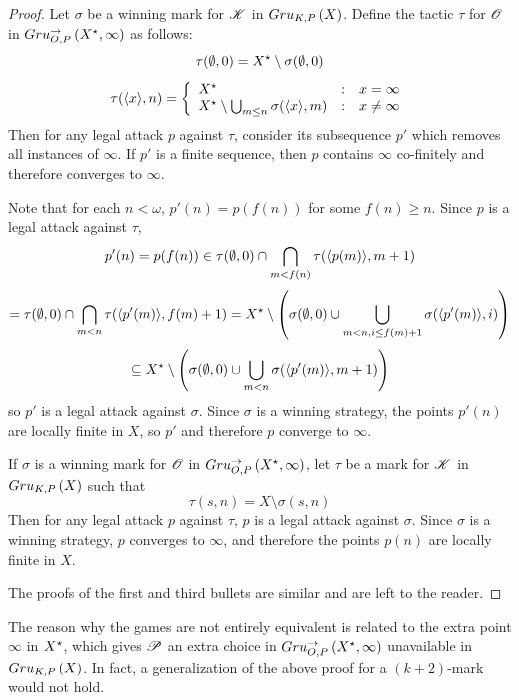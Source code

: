 \documentclass{amsart}
\theoremstyle{definition}
\begin{document}
\begin{proof}
  Let $\sigma$ be a winning mark for $\mathscr{K}$ in $Gru_{K,P}\left({X}\right)$.
  Define the tactic $\tau$ for $\mathscr{O}$ in $Gru_{O,P}^{\to}\left({X^\star},{\infty}\right)$
  as follows:
    \[
      \tau(\emptyset,0) = X^\star\setminus \sigma(\emptyset,0)
    \]
    \[
      \tau(\langle x\rangle,n) =
        \left\{
          \begin{array}{lcr}
            X^\star &
            : &
            x=\infty
              \\
            X^\star \setminus \bigcup_{m\leq n}\sigma(\langle x\rangle,m) &
            : &
            x\not=\infty
          \end{array}
        \right.
    \]
  Then for any legal attack $p$ against $\tau$, consider its subsequence
  $p'$ which removes all instances of $\infty$.
  If $p'$ is a finite sequence, then $p$ contains $\infty$ co-finitely and
  therefore converges to $\infty$.

  Note that for each $n<\omega$, $p'(n)=p(f(n))$ for some $f(n)\geq n$. Since
  $p$ is a legal attack against $\tau$,
    \[
      p'(n)
        =
      p(f(n))
        \in
      \tau(\emptyset,0)
        \cap
      \bigcap_{m<f(n)}\tau(\langle p(m)\rangle,m+1)
    \]
    \[
        =
      \tau(\emptyset,0)
        \cap
      \bigcap_{m<n}\tau(\langle p'(m)\rangle,f(m)+1)
        =
      X^\star
        \setminus
      \left(
        \sigma(\emptyset,0)
          \cup
        \bigcup_{m<n,i\leq f(m)+1}\sigma(\langle p'(m)\rangle,i)
      \right)
    \]
    \[
        \subseteq
      X^\star
        \setminus
      \left(
        \sigma(\emptyset,0)
          \cup
        \bigcup_{m<n}\sigma(\langle p'(m)\rangle,m+1)
      \right)
    \]
  so $p'$ is a legal attack against $\sigma$. Since $\sigma$ is a winning
  strategy, the points $p'(n)$ are locally finite in $X$, so
  $p'$ and therefore $p$ converge to $\infty$.

  If $\sigma$ is a winning mark for $\mathscr{O}$ in
  $Gru_{O,P}^{\to}\left({X^\star},{\infty}\right)$, let $\tau$ be a mark for
  $\mathscr{K}$ in $Gru_{K,P}\left({X}\right)$ such that
    \[
      \tau(s,n) = X\setminus \sigma(s,n)
    \]
  Then for any legal attack $p$ against $\tau$, $p$ is a legal attack against
  $\sigma$. Since $\sigma$ is a winning
  strategy, $p$ converges to $\infty$,
  and therefore the points $p(n)$ are locally finite in $X$.

  The proofs of the first and third bullets are similar and are left to
  the reader.
\end{proof}

The reason why the games are not entirely equivalent is related to the extra
point $\infty$ in $X^\star$, which gives $\mathscr{P}$ an extra choice in
$Gru_{O,P}^{\to}\left({X^\star},{\infty}\right)$ unavailable in $Gru_{K,P}\left({X}\right)$.
In fact, a generalization of the above proof for a $(k+2)$-mark would not
hold.
\end{document}
